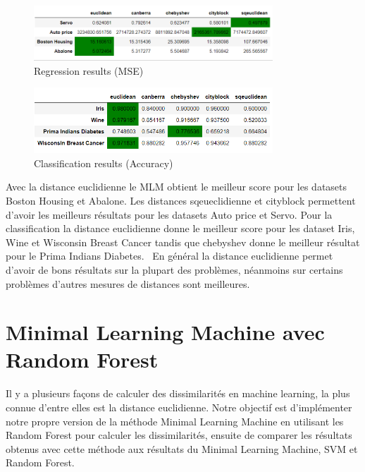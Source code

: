 \documentclass[12pt,a4paper]{report}
\begin{document}
\begin{figure}[!h]
  \begin{center}
    \includegraphics[width=0.8\textwidth]{regr_distances.png}
  \end{center}
  \caption{Regression results (MSE)}
\end{figure}

\begin{figure}[!h]
  \begin{center}
    \includegraphics[width=0.8\textwidth]{classif_distances.png}
  \end{center}
  \caption{Classification results (Accuracy)}
\end{figure}
\par Avec la distance euclidienne le MLM obtient le meilleur score pour les datasets Boston Housing et Abalone. Les distances sqeueclidienne et cityblock permettent d'avoir les meilleurs résultats pour les datasets Auto price et Servo. 
Pour la classification la distance euclidienne donne le meilleur score pour les dataset Iris, Wine et Wisconsin Breast Cancer tandis que chebyshev donne le meilleur résultat pour le Prima Indians Diabetes. \
En général la distance euclidienne permet d'avoir de bons résultats sur la plupart des problèmes, néanmoins sur certains problèmes d'autres mesures de distances sont meilleures.
 
{\color{MidnightBlue}\chapter{Minimal Learning Machine avec Random Forest}}
\par Il y a plusieurs façons de calculer des dissimilarités en machine learning, la plus connue d'entre elles est la distance euclidienne. Notre objectif est d'implémenter notre propre version de la méthode Minimal Learning Machine en utilisant les Random Forest pour calculer les dissimilarités, ensuite de comparer les résultats obtenus avec cette méthode aux résultats du Minimal Learning Machine, SVM et Random Forest.
\end{document}
